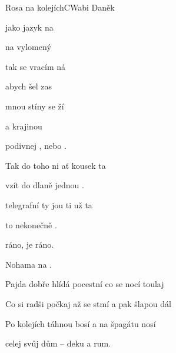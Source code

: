 \setcounter{page}{74}
\begin{song}{Rosa na kolejích}{C}{Wabi Daněk}

\begin{SBVerse}

 jako jazyk  na

na vylomený 

tak se vracím  ná

abych šel zas 

 mnou stíny se ží

a  krajinou 

podivnej ,  nebo .

\end{SBVerse}

\begin{SBChorus}

Tak do toho ni ať  kousek ta

vzít do dlaně   jednou .

telegrafní ty jou ti už ta

to nekonečně  .

 ráno, je ráno.

Nohama   na .

\end{SBChorus}

\begin{SBVerse}

Pajda dobře hlídá pocestní co se nocí toulaj

Co si radši počkaj až se stmí a pak šlapou dál

Po kolejích táhnou bosí a na špagátu nosí

celej svůj dům -- deku a rum.

\end{SBVerse}

\begin{SBChorus}

\end{SBChorus}

\end{song}

\clearpage
